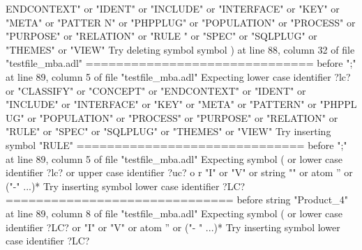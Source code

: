 {  ENDCONTEXT" or "IDENT" or "INCLUDE" or "INTERFACE" or "KEY" or "META" or "PATTER\newline
  N" or "PHPPLUG" or "POPULATION" or "PROCESS" or "PURPOSE" or "RELATION" or "RULE\newline
  " or "SPEC" or "SQLPLUG" or "THEMES" or "VIEW"\newline
  Try deleting symbol symbol ) at line 88, column 32 of file "testfile\_mba.adl"\newline
  \newline
  ==============================\newline
  \newline
  before ";" at line 89, column 5 of file "testfile\_mba.adl"\newline
  Expecting lower case identifier ?lc? or "CLASSIFY" or "CONCEPT" or "ENDCONTEXT"\newline
  or "IDENT" or "INCLUDE" or "INTERFACE" or "KEY" or "META" or "PATTERN" or "PHPPL\newline
  UG" or "POPULATION" or "PROCESS" or "PURPOSE" or "RELATION" or "RULE" or "SPEC"\newline
  or "SQLPLUG" or "THEMES" or "VIEW"\newline
  Try inserting symbol "RULE"\newline
  \newline
  ==============================\newline
  \newline
  before ";" at line 89, column 5 of file "testfile\_mba.adl"\newline
  Expecting symbol ( or lower case identifier ?lc? or upper case identifier ?uc? o\newline
  r "I" or "V" or string "" or atom '' or ("-" ...)*\newline
  Try inserting symbol lower case identifier ?LC?\newline
  \newline
  ==============================\newline
  \newline
  before string "Product\_4" at line 89, column 8 of file "testfile\_mba.adl"\newline
  Expecting symbol ( or lower case identifier ?LC? or "I" or "V" or atom '' or ("-\newline
  " ...)*\newline
  Try inserting symbol lower case identifier ?LC?\newline
  \newline
}
